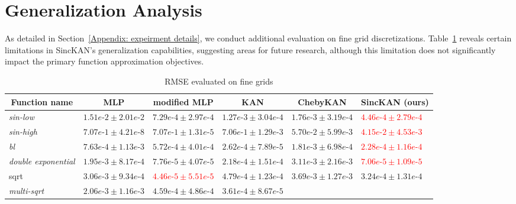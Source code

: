 \section{Generalization Analysis}\label{Appendix: fine grids}
As detailed in Section~\ref{Appendix: expeirment details}, we conduct additional evaluation on fine grid discretizations. Table~\ref{table: function fine grids} reveals certain limitations in SincKAN's generalization capabilities, suggesting areas for future research, although this limitation does not significantly impact the primary function approximation objectives.

\begin{table}[ht]
\caption{RMSE evaluated on fine grids}
\label{table: function fine grids}
\begin{center}
\begin{adjustbox}{width=\columnwidth, center}
\begin{tabular}{llllll}
\multicolumn{1}{c}{\bf Function name}  & \multicolumn{1}{c}{\bf MLP} & \multicolumn{1}{c}{\bf modified MLP} &\multicolumn{1}{c}{\bf KAN} & \multicolumn{1}{c}{\bf ChebyKAN} & \multicolumn{1}{c}{\bf SincKAN (ours)} 
\\ \hline 
\textit{sin-low} & $1.51 e\mbox{-}2 \pm 2.01 e\mbox{-}2$ & $7.29e\mbox{-}4 \pm 2.97 e\mbox{-}4$ & $1.27e\mbox{-}3 \pm 3.04e\mbox{-}4$ &
$1.76e\mbox{-}3 \pm 3.19e\mbox{-}4$ &
\textcolor{red}{$4.46 e\mbox{-}4 \pm 2.79 e\mbox{-}4$} \\ 
\textit{sin-high} & $7.07e\mbox{-}1 \pm 4.21e\mbox{-}8$ & $7.07 e\mbox{-}1 \pm 1.31 e\mbox{-}5$ & $7.06e\mbox{-}1 \pm 1.29e\mbox{-}3$ &
$5.70e\mbox{-}2 \pm 5.99 e\mbox{-}3$ &
\textcolor{red}{$4.15e\mbox{-}2 \pm 4.53e\mbox{-}3$} \\ 
\textit{bl} & $7.63e\mbox{-}4 \pm 1.13e\mbox{-}3$ & $5.72e\mbox{-}4 \pm 4.01e\mbox{-}4$ & $2.62e\mbox{-}4 \pm 7.89e\mbox{-}5$ &
$1.81e\mbox{-}3 \pm 6.98e\mbox{-}4$ &
\textcolor{red}{$2.28e\mbox{-}4 \pm 1.16e\mbox{-}4$} \\ 
\textit{double exponential} & $1.95e\mbox{-}3 \pm 8.17e\mbox{-}4$ & $7.76e\mbox{-}5 \pm 4.07e\mbox{-}5$ & $2.18e\mbox{-}4 \pm 1.51e\mbox{-}4$ &
$3.11e\mbox{-}3 \pm 2.16 e\mbox{-}3$ &
\textcolor{red}{$7.06e\mbox{-}5 \pm 1.09e\mbox{-}5$} \\ 
sqrt & $3.06e\mbox{-}3 \pm 9.34 e\mbox{-}4$ & \textcolor{red}{$4.46 e\mbox{-}5 \pm 5.51e\mbox{-}5$} & $4.79e\mbox{-}4 \pm 1.23e\mbox{-}4$ &
$3.69e\mbox{-}3 \pm 1.27 e\mbox{-}3$ &
$3.24e\mbox{-}4 \pm 1.31e\mbox{-}4$\\ 
\textit{multi-sqrt} & $2.06e\mbox{-}3 \pm 1.16e\mbox{-}3$ & $4.59e\mbox{-}4 \pm 4.86e\mbox{-}4$ & $3.61e\mbox{-}4 \pm 8.67 e\mbox{-}5$ &

\end{tabular}
\end{adjustbox}
\end{center}
\end{table}
